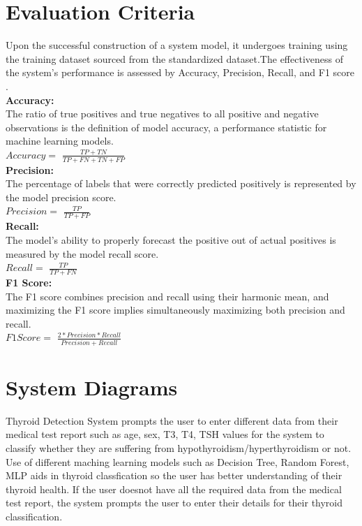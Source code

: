 \section{Evaluation Criteria}
Upon the successful construction of a system model, it undergoes training using the training dataset sourced from
the standardized dataset.The effectiveness of the system's performance is assessed by Accuracy, Precision, Recall, and F1 score
.\\
\textbf{Accuracy:}\\
The ratio of true positives and true negatives to all positive and negative observations is the definition of model accuracy, a performance statistic for machine learning models.\\
$Accuracy =$ $\frac{TP + TN}{TP + FN + TN + FP}$\\
\textbf{Precision:}\\
The percentage of labels that were correctly predicted positively is represented by the model precision score.\\
$Precision =$ $\frac{TP}{TP + FP}$\\
\textbf{Recall:}\\
The model's ability to properly forecast the positive out of actual positives is measured by the model recall score.\\
$Recall =$ $\frac{TP}{TP + FN}$\\
\textbf{F1 Score:}\\
The F1 score combines precision and recall using their harmonic mean, and maximizing the F1 score implies
simultaneously maximizing both precision and recall.\\
$F1 Score =$ $\frac{2*Precision*Recall}{Precision+Recall}$\\

\section{System Diagrams}
Thyroid Detection System prompts the user to enter different data from their medical test report such as age, sex, T3, T4, TSH values for the system to classify whether they are suffering from hypothyroidism/hyperthyroidism or not. Use of different maching learning models such as Decision Tree, Random Forest, MLP aids in thyroid classfication so the user has better understanding of their thyroid health. If the user doesnot have all the required data from the medical test report, the system prompts the user to enter their details for their thyroid classification.
